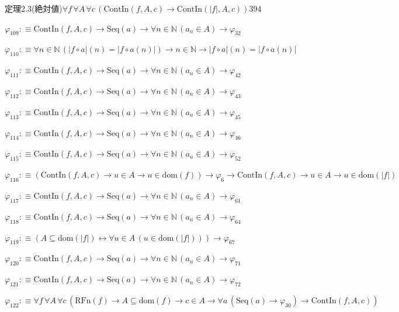 \begin{fullproof}{定理2.3(絶対値)}{$\forall f\,\forall A\,\forall c\,(\mathrm{ContIn}(f,A,c) \to \mathrm{ContIn}(\lvert f \rvert,A,c))$}{394}
\begin{abbrevlist}
\item $\varphi_{109} :\equiv \mathrm{ContIn}(f,A,c) \to \mathrm{Seq}(a) \to \forall n \in \mathbb{N}\,(a_{n} \in A) \to \varphi_{32}$
\item $\varphi_{110} :\equiv \forall n \in \mathbb{N}\,(\lvert f \circ a \rvert(n) = \lvert f \circ a(n) \rvert) \to n \in \mathbb{N} \to \lvert f \circ a \rvert(n) = \lvert f \circ a(n) \rvert$
\item $\varphi_{111} :\equiv \mathrm{ContIn}(f,A,c) \to \mathrm{Seq}(a) \to \forall n \in \mathbb{N}\,(a_{n} \in A) \to \varphi_{42}$
\item $\varphi_{112} :\equiv \mathrm{ContIn}(f,A,c) \to \mathrm{Seq}(a) \to \forall n \in \mathbb{N}\,(a_{n} \in A) \to \varphi_{43}$
\item $\varphi_{113} :\equiv \mathrm{ContIn}(f,A,c) \to \mathrm{Seq}(a) \to \forall n \in \mathbb{N}\,(a_{n} \in A) \to \varphi_{45}$
\item $\varphi_{114} :\equiv \mathrm{ContIn}(f,A,c) \to \mathrm{Seq}(a) \to \forall n \in \mathbb{N}\,(a_{n} \in A) \to \varphi_{46}$
\item $\varphi_{115} :\equiv \mathrm{ContIn}(f,A,c) \to \mathrm{Seq}(a) \to \forall n \in \mathbb{N}\,(a_{n} \in A) \to \varphi_{52}$
\item $\varphi_{116} :\equiv (\mathrm{ContIn}(f,A,c) \to u \in A \to u \in \mathrm{dom}(f)) \to \varphi_{6} \to \mathrm{ContIn}(f,A,c) \to u \in A \to u \in \mathrm{dom}(\lvert f \rvert)$
\item $\varphi_{117} :\equiv \mathrm{ContIn}(f,A,c) \to \mathrm{Seq}(a) \to \forall n \in \mathbb{N}\,(a_{n} \in A) \to \varphi_{61}$
\item $\varphi_{118} :\equiv \mathrm{ContIn}(f,A,c) \to \mathrm{Seq}(a) \to \forall n \in \mathbb{N}\,(a_{n} \in A) \to \varphi_{64}$
\item $\varphi_{119} :\equiv (A \subseteq \mathrm{dom}(\lvert f \rvert) \leftrightarrow \forall u \in A\,(u \in \mathrm{dom}(\lvert f \rvert))) \to \varphi_{67}$
\item $\varphi_{120} :\equiv \mathrm{ContIn}(f,A,c) \to \mathrm{Seq}(a) \to \forall n \in \mathbb{N}\,(a_{n} \in A) \to \varphi_{71}$
\item $\varphi_{121} :\equiv \mathrm{ContIn}(f,A,c) \to \mathrm{Seq}(a) \to \forall n \in \mathbb{N}\,(a_{n} \in A) \to \varphi_{72}$
\item $\varphi_{122} :\equiv \forall f\,\forall A\,\forall c\,(\mathrm{RFn}(f) \to A \subseteq \mathrm{dom}(f) \to c \in A \to \forall a\,(\mathrm{Seq}(a) \to \varphi_{30}) \to \mathrm{ContIn}(f,A,c))$

\end{abbrevlist}
\end{fullproof}
